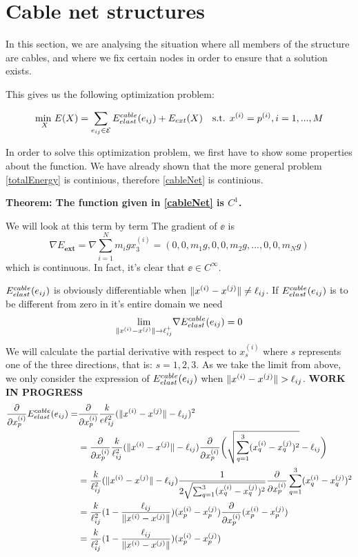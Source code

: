 \section{Cable net structures}
In this section, we are analysing the situation where all members of the structure are cables, and where we fix certain nodes in order to ensure that a solution exists.

This gives us the following optimization problem:

\begin{equation}
    \underset{X}{\text{min }} E(X) = \sum\limits_{e_{ij} \in \mathcal{E}} E^{cable}_{elast}(e_{ij}) + E_{ext}(X) \quad \text{s.t. } x^{(i)} = p^{(i)}, i = 1,...,M
    \label{cableNet}
\end{equation}

In order to solve this optimization problem, we first have to show some properties about the function. We have already shown that the more general problem \eqref{totalEnergy} is continious, therefore \eqref{cableNet} is continious.

\textbf{Theorem: The function given in \eqref{cableNet} is $C^1$.}

We will look at this term by term
The gradient of $\ee$ is 
\begin{equation}
    \nabla E_{\textbf{ext}} = \nabla \sum_{i=1}^N m_i g x_3^{(i)}
    = (0,0,m_1 g, 0,0,m_2 g,...,0,0,m_N g)
    \label{gradient_external_force}
\end{equation}
which is continuous. In fact, it's clear that $\ee \in C^{\infty}$.

$E^{cable}_{elast}(e_{ij})$ is obviously differentiable when $\lVert x^{(i)} - x^{(j)}\rVert \neq \ell_{ij}$. If $E^{cable}_{elast}(e_{ij})$ is to be different from zero in it's entire domain we need 
\begin{equation}
    \underset{\lVert x^{(i)} - x^{(j)}\rVert \to \ell_{ij} ^+}{\text{lim}} \nabla E^{cable}_{elast}(e_{ij}) = 0    
\end{equation}
We will calculate the partial derivative with respect to $x_s^{(i)}$ where $s$ represents one of the three directions, that is: $s=1,2,3$. As we take the limit from above, we only consider the expression of $E^{cable}_{elast}(e_{ij})$ when $\lVert x^{(i)} - x^{(j)}\rVert > \ell_{ij}$.
\textbf{WORK IN PROGRESS}
\begin{align}
    \frac{\partial}{\partial x_p^{(i)}} E^{cable}_{elast}(e_{ij}) = &\frac{\partial}{\partial x_p^{(i)}}  \frac{k}{e \ell_{ij}^2} (\lVert x^{(i)} - x^{(j)}\rVert - \ell_{ij})^2\\ 
    &= \frac{\partial}{\partial x_p^{(i)}}\frac{k}{\ell_{ij}^2}(\lVert x^{(i)} - x^{(j)}\rVert - \ell_{ij}) \frac{\partial}{\partial x_p^{(i)}} \bigg(\sqrt{ \sum_{q=1}^3 (x_q^{(i)}-x_q^{(j)})^2}-\ell_{ij}\bigg)\\&=\frac{k}{\ell_{ij}^2} (\lVert x^{(i)} - x^{(j)}\rVert - \ell_{ij}) \frac{1}{2\sqrt{\sum_{q=1}^3 (x_q^{(i)}-x_q^{(j)})^2}}\frac{\partial}{\partial x_p^{(i)}} \sum_{q=1}^3(x_q^{(i)}-x_q^{(j)})^2\\ &= \frac{k}{\ell_{ij}^2} (1 - \frac{\ell_{ij}}{\lVert x^{(i)} - x^{(j)}\rVert}) (x_p^{(i)} - x_p^{(j)}) \frac{\partial}{\partial x_p^{(i)}} (x_p^{(i)} - x_p^{(j)})\\ &= \frac{k}{\ell_{ij}^2} (1- \frac{\ell_{ij}}{\lVert x^{(i)} - x^{(j)}\rVert}) (x_p^{(i)} - x_p^{(j)})
\end{align}

